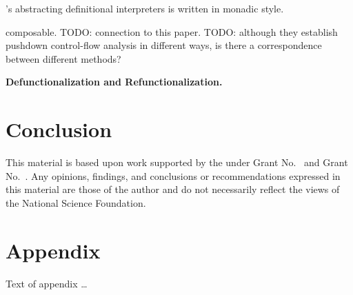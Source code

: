 \documentclass[acmsmall,review,anonymous]{acmart}\settopmatter{printfolios=true,printccs=false,printacmref=false}
\begin{document}
\citeauthor{darais2017abstracting}'s abstracting definitional interpreters is written
in monadic style.

composable.
TODO: connection to this paper.
TODO: although they establish pushdown control-flow analysis in different ways, 
is there a correspondence between different methods?

\textbf{Defunctionalization and Refunctionalization.}

\section{Conclusion}

\begin{acks}                            %
  This material is based upon work supported by the
   under Grant
  No.~ and Grant
  No.~.  Any opinions, findings, and
  conclusions or recommendations expressed in this material are those
  of the author and do not necessarily reflect the views of the
  National Science Foundation.
\end{acks}



\appendix
\section{Appendix}

Text of appendix \ldots
\end{document}
